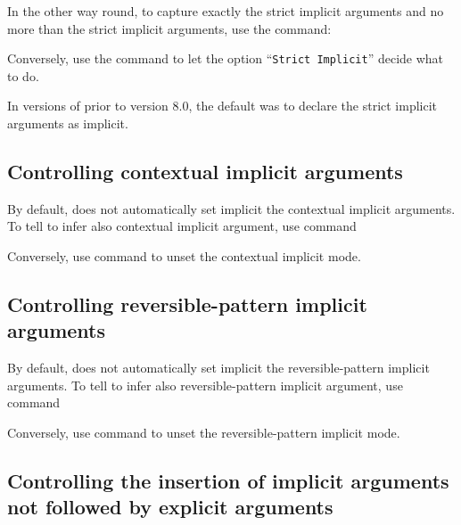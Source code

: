 In the other way round, to capture exactly the strict implicit arguments and no more than the strict implicit arguments, use the command:
\begin{quote}
{}
\end{quote}
Conversely, use the command {} to
let the option ``{\tt Strict Implicit}'' decide what to do.

\Rem In versions of {\Coq} prior to version 8.0, the default was to
declare the strict implicit arguments as implicit.

\subsection{Controlling contextual implicit arguments
\label{SetContextualImplicit}}

By default, {\Coq} does not automatically set implicit the contextual
implicit arguments. To tell {\Coq} to infer also contextual implicit
argument, use command  
\begin{quote}
{}
\end{quote}
Conversely, use command {} to
unset the contextual implicit mode.

\subsection{Controlling reversible-pattern implicit arguments
\label{SetReversiblePatternImplicit}}

By default, {\Coq} does not automatically set implicit the reversible-pattern
implicit arguments. To tell {\Coq} to infer also reversible-pattern implicit
argument, use command  
\begin{quote}
{}
\end{quote}
Conversely, use command {} to
unset the reversible-pattern implicit mode.

\subsection{Controlling the insertion of implicit arguments not followed by explicit arguments
\label{SetMaximalImplicitInsertion}}

